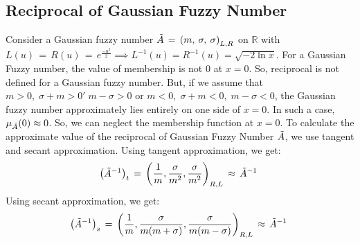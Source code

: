 \documentclass{article}
\begin{document}
\subsection{Reciprocal of Gaussian Fuzzy Number}
Consider a Gaussian fuzzy number $\Tilde{A} \,=\, \left(m,\: \sigma, \:\sigma\right)_{L,R}$ on $\mathbb{R}$ with $L(u) \,=\, R(u)\,=\,e^{\frac{-u^2}{2}}\implies L^{-1}(u) = R^{-1} (u) = \sqrt{-2\ln{x}}$. For a Gaussian Fuzzy number, the value of membership is not 0 at $x = 0$. So, reciprocal is not defined for a Gaussian fuzzy number. But, if we assume that $m>0,\; \sigma + m>0 '\; m-\sigma>0$ or $m<0,\; \sigma + m <0,\; m-\sigma <0$, the Gaussian fuzzy number approximately lies entirely on one side of $x = 0$. In such a case, $\mu_{\Tilde{A}}(0)\approx0$. So, we can neglect the membership function at $x = 0$. To calculate the approximate value of the reciprocal of Gaussian Fuzzy Number $\Tilde{A}$, we use tangent and secant approximation. Using tangent approximation, we get:
\begin{equation}
    \left(\Tilde{A}^{-1}\right)_t \,=\, \left(\frac{1}{m}, \frac{\sigma}{{m}^2}, \frac{\sigma}{{m}^2}\right)_{R,L} \, \approx\, \Tilde{A}^{-1}\; 
\end{equation}\newline Using secant approximation, we get:
\begin{equation}
    \left(\Tilde{A}^{-1}\right)_s \,=\, \left(\frac{1}{m}, \frac{\sigma}{m(m + \sigma)}, \frac{\sigma}{m(m - \sigma)}\right)_{R,L} \, \approx\, \Tilde{A}^{-1}\; 
\end{equation} 
\end{document}
